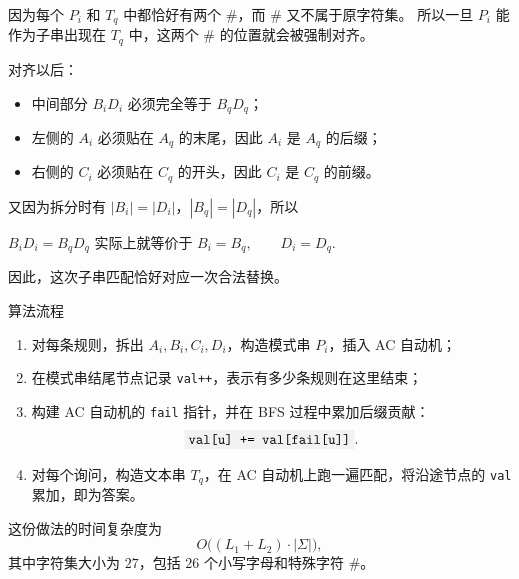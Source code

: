 \documentclass{book}
\newcommand{\code}[1]{\colorbox{codebg}{\texttt{#1}}}  %
\begin{document}
因为每个 $P_i$ 和 $T_q$ 中都恰好有两个 $\mathtt{\#}$，而 $\mathtt{\#}$ 又不属于原字符集。  
所以一旦 $P_i$ 能作为子串出现在 $T_q$ 中，这两个 $\mathtt{\#}$ 的位置就会被强制对齐。

对齐以后：

\begin{itemize}[leftmargin=2em,itemsep=1pt,topsep=2pt,parsep=0pt,partopsep=0pt]
    \item 中间部分 $B_iD_i$ 必须完全等于 $B_qD_q$；
    \item 左侧的 $A_i$ 必须贴在 $A_q$ 的末尾，因此 $A_i$ 是 $A_q$ 的后缀；
    \item 右侧的 $C_i$ 必须贴在 $C_q$ 的开头，因此 $C_i$ 是 $C_q$ 的前缀。
\end{itemize}

又因为拆分时有 $|B_i|=|D_i|$，$|B_q|=|D_q|$，所以

$B_iD_i=B_qD_q$
实际上就等价于
$
B_i=B_q,\qquad D_i=D_q.
$

因此，这次子串匹配恰好对应一次合法替换。

\begin{keybox}{算法流程}
\begin{enumerate}[leftmargin=2em,itemsep=1pt,topsep=2pt,parsep=0pt,partopsep=0pt]
    \item 对每条规则，拆出 $A_i,B_i,C_i,D_i$，构造模式串 $P_i$，插入 AC 自动机；
    \item 在模式串结尾节点记录 \code{val++}，表示有多少条规则在这里结束；
    \item 构建 AC 自动机的 \code{fail} 指针，并在 BFS 过程中累加后缀贡献：
    \[
    \code{val[u] += val[fail[u]]}.
    \]
    \item 对每个询问，构造文本串 $T_q$，在 AC 自动机上跑一遍匹配，将沿途节点的 \code{val} 累加，即为答案。
\end{enumerate}
\end{keybox}

这份做法的时间复杂度为
\[
O\bigl((L_1+L_2)\cdot |\Sigma|\bigr),
\]
其中字符集大小为 $27$，包括 $26$ 个小写字母和特殊字符 $\mathtt{\#}$。
\end{document}
